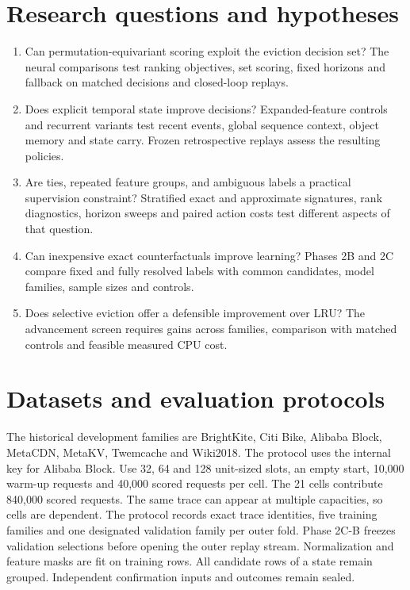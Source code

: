 \documentclass[11pt,letterpaper]{article}
\newcommand{\code}[1]{\texttt{\detokenize{#1}}}
\begin{document}
\section{Research questions and hypotheses}
\begin{enumerate}
\item Can permutation-equivariant scoring exploit the eviction decision set? The neural comparisons test ranking objectives, set scoring, fixed horizons and fallback on matched decisions and closed-loop replays.
\item Does explicit temporal state improve decisions? Expanded-feature controls and recurrent variants test recent events, global sequence context, object memory and state carry. Frozen retrospective replays assess the resulting policies.
\item Are ties, repeated feature groups, and ambiguous labels a practical supervision constraint? Stratified exact and approximate signatures, rank diagnostics, horizon sweeps and paired action costs test different aspects of that question.
\item Can inexpensive exact counterfactuals improve learning? Phases 2B and 2C compare fixed and fully resolved labels with common candidates, model families, sample sizes and controls.
\item Does selective eviction offer a defensible improvement over LRU? The advancement screen requires gains across families, comparison with matched controls and feasible measured CPU cost.
\end{enumerate}

\section{Datasets and evaluation protocols}
The historical development families are BrightKite, Citi Bike, Alibaba Block, MetaCDN, MetaKV, Twemcache and Wiki2018. The protocol uses the internal key \code{cloudphysics} for Alibaba Block. Use 32, 64 and 128 unit-sized slots, an empty start, 10,000 warm-up requests and 40,000 scored requests per cell. The 21 cells contribute 840,000 scored requests. The same trace can appear at multiple capacities, so cells are dependent. The protocol records exact trace identities, five training families and one designated validation family per outer fold. Phase 2C-B freezes validation selections before opening the outer replay stream. Normalization and feature masks are fit on training rows. All candidate rows of a state remain grouped. Independent confirmation inputs and outcomes remain sealed.
\end{document}
